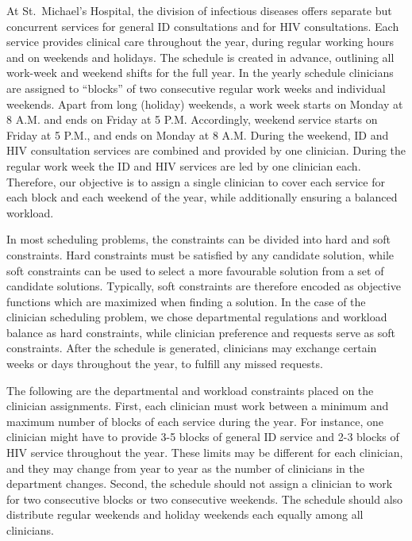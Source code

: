 At St.\ Michael's Hospital, the division of infectious diseases offers
separate but concurrent services for general ID consultations and for HIV consultations. Each
service provides clinical care throughout the year, during regular working hours
and on weekends and holidays. The schedule is created in advance,
outlining all work-week and weekend shifts for the full year.
In the yearly schedule clinicians are assigned to ``blocks'' of
two consecutive regular work weeks and individual weekends. Apart
from long (holiday) weekends, a work week starts on Monday at 8 A.M. and ends on
Friday at 5 P.M. Accordingly, weekend service starts on Friday at 5 P.M., and
ends on Monday at 8 A.M. During the weekend, ID and HIV consultation services
are combined and provided by one clinician. During the regular work week the ID
and HIV services are led by one clinician each.
Therefore, our objective is to assign a single clinician to cover
each service for each block and each weekend of the year, while 
additionally ensuring a balanced workload.

In most scheduling problems, the constraints can be divided into hard and soft
constraints. Hard constraints must be satisfied by any candidate solution, while
soft constraints can be used to select a more favourable solution from a set of
candidate solutions. Typically, soft constraints are therefore encoded as objective
functions which are
maximized when finding a solution. In the case of the clinician
scheduling problem, we chose departmental regulations and workload balance as hard constraints,
while clinician preference and requests serve as soft constraints.
After the schedule is generated, clinicians may
exchange certain weeks or days throughout the year, to fulfill any missed requests.

The following are the departmental and workload constraints placed on the clinician assignments. 
First, each clinician
must work between a minimum and maximum number of blocks of each service during the year.
For instance, one clinician might have to
provide 3-5 blocks of general ID service and 2-3 blocks of HIV service
throughout the year. These limits may be different for each clinician,
and they may change from year to year as
the number of clinicians in the department changes. Second, the schedule
should not assign a clinician to work for two consecutive blocks or two
consecutive weekends. The schedule should also distribute regular
weekends and holiday weekends each equally among all clinicians.

